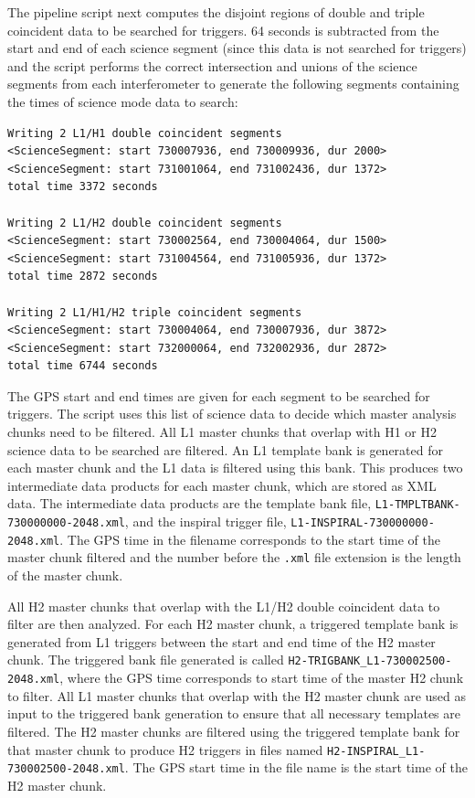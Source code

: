 The pipeline script next computes the disjoint regions of double and triple
coincident data to be searched for triggers. 64 seconds is subtracted from the
start and end of each science segment (since this data is not searched for
triggers) and the script performs the correct intersection and unions of the
science segments from each interferometer to generate the following segments
containing the times of science mode data to search:
\begin{verbatim}
Writing 2 L1/H1 double coincident segments 
<ScienceSegment: start 730007936, end 730009936, dur 2000>
<ScienceSegment: start 731001064, end 731002436, dur 1372>
total time 3372 seconds 

Writing 2 L1/H2 double coincident segments 
<ScienceSegment: start 730002564, end 730004064, dur 1500>
<ScienceSegment: start 731004564, end 731005936, dur 1372>
total time 2872 seconds 
 
Writing 2 L1/H1/H2 triple coincident segments 
<ScienceSegment: start 730004064, end 730007936, dur 3872>
<ScienceSegment: start 732000064, end 732002936, dur 2872>
total time 6744 seconds
\end{verbatim}
The GPS start and end times are given for each segment to be searched for
triggers.  The script uses this list of science data to decide which master
analysis chunks need to be filtered. All L1 master chunks that overlap with H1
or H2 science data to be searched are filtered. An L1 template bank is
generated for each master chunk and the L1 data is filtered using this bank.
This produces two intermediate data products for each master chunk, which are
stored as XML data. The intermediate data products are the template bank file,
\verb|L1-TMPLTBANK-730000000-2048.xml|, and the inspiral trigger file,
\verb|L1-INSPIRAL-730000000-2048.xml|. The GPS time in the filename
corresponds to the start time of the master chunk filtered and the number
before the \verb|.xml| file extension is the length of the master chunk.

All H2 master chunks that overlap with the L1/H2 double coincident data to
filter are then analyzed. For each H2 master chunk, a triggered template bank
is generated from L1 triggers between the start and end time of the H2 master
chunk. The triggered bank file generated is called
\verb|H2-TRIGBANK_L1-730002500-2048.xml|, where the GPS time corresponds to
start time of the master H2 chunk to filter. All L1 master chunks that overlap
with the H2 master chunk are used as input to the triggered bank generation to
ensure that all necessary templates are filtered.  The H2 master chunks are
filtered using the triggered template bank for that master chunk to produce H2
triggers in files named \verb|H2-INSPIRAL_L1-730002500-2048.xml|. The GPS
start time in the file name is the start time of the H2 master chunk.

